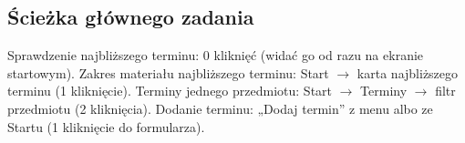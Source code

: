 \subsection{Ścieżka głównego zadania}
Sprawdzenie najbliższego terminu: 0 kliknięć (widać go od razu na ekranie startowym). Zakres materiału
najbliższego terminu: Start $\to$ karta najbliższego terminu (1 kliknięcie). Terminy jednego przedmiotu:
Start $\to$ Terminy $\to$ filtr przedmiotu (2 kliknięcia). Dodanie terminu: „Dodaj termin” z menu albo ze
Startu (1 kliknięcie do formularza).
